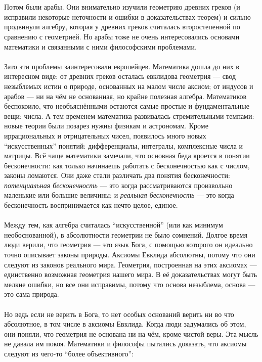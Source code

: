 \documentclass[11pt]{book}
\begin{document}
\\ \\
Потом были арабы.
Они внимательно изучили геометрию древних греков (и исправили некоторые неточности и ошибки в доказательствах теорем)
и сильно продвинули алгебру, которая у древних греков считалась второстепенной по сравнению с геометрией.
Но арабы тоже не очень интересовались основами математики и связанными с ними философскими проблемами.
\\ \\
Зато эти проблемы заинтересовали европейцев.
Математика дошла до них в интересном виде:
от древних греков осталась евклидова геометрия --- свод незыблемых истин о природе, основанных на малом числе аксиом;
от индусов и арабов --- ни на чём не основанная, но крайне полезная алгебра.
Математиков беспокоило, что необъяснёнными остаются самые простые и фундаментальные вещи: числа.
А тем временем математика развивалась стремительными темпами: новые теории были позарез нужны физикам и астрономам.
Кроме иррациональных и отрицательных чисел, появилось много новых ``искусственных'' понятий: дифференциалы, интегралы, комплексные числа и матрицы.
Всё чаще математики замечали, что основная беда кроется в понятии бесконечности:
как только начинаешь работать с бесконечностью как с числом, законы ломаются.
Они даже стали различать два понятия бесконечности: \emph{потенциальная бесконечность} --- это когда рассматриваются произвольно маленькие или большие величины;
и \emph{реальная бесконечность} --- это когда бесконечность воспринимается как нечто целое, единое.
\\ \\
Между тем, как алгебра считалась ``искусственной'' (или как минимум необоснованной), в абсолютности геометрии не было сомнений.
Долгое время люди верили, что геометрия --- это язык Бога, с помощью которого он идеально точно описывает законы природы.
Аксиомы Евклида абсолютны, потому что они следуют из законов реального мира.
Геометрия, построенная на этих аксиомах --- единственно возможная геометрия нашего мира.
В её доказательствах могут быть мелкие ошибки, но все они исправимы, потому что основа незыблема, основа --- это сама природа.
\\ \\
Но ведь если не верить в Бога, то нет особых оснований верить ни во что абсолютное, в том числе в аксиомы Евклида.
Когда люди задумались об этом, они поняли, что геометрия не основана ни на чём, кроме чистой веры.
Эта мысль не давала им покоя.
Математики и философы пытались доказать, что аксиомы следуют из чего-то ``более объективного'':
\end{document}
